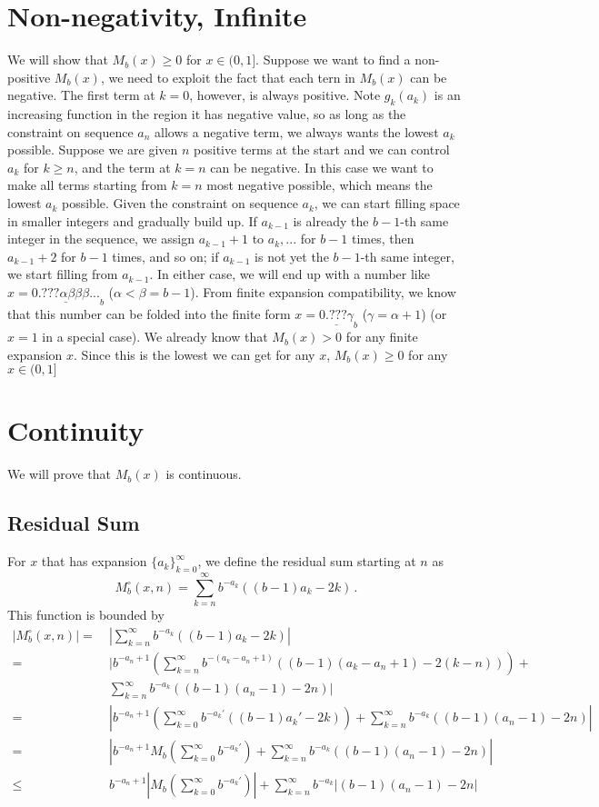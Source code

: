 \documentclass[]{article}
\begin{document}
\section{Non-negativity, Infinite}
We will show that $M_b(x) \ge 0$ for $x \in (0, 1]$. Suppose we want to find a non-positive $M_b(x)$, we need to exploit the fact that each tern in $M_b(x)$ can be negative. The first term at $k = 0$, however, is always positive. Note $g_k(a_k)$ is an increasing function in the region it has negative value, so as long as the constraint on sequence $a_n$ allows a negative term, we always wants the lowest $a_k$ possible. Suppose we are given $n$ positive terms at the start and we can control $a_k$ for $k \ge n$, and the term at $k=n$ can be negative. In this case we want to make all terms starting from $k=n$ most negative possible, which means the lowest $a_k$ possible. Given the constraint on sequence $a_k$, we can start filling space in smaller integers and gradually build up. If $a_{k-1}$ is already the $b-1$-th same integer in the sequence, we assign $a_{k-1}+1$ to $a_k,...$ for $b-1$ times, then $a_{k-1}+2$ for $b - 1$ times, and so on; if  $a_{k-1}$ is not yet the $b-1$-th same integer, we start filling from $a_{k-1}$. In either case, we will end up with a number like $x = \underline{0.???\alpha\beta\beta\beta...}_b$ ($\alpha < \beta = b - 1$). From finite expansion compatibility, we know that this number can be folded into the finite form $x = \underline{0.???\gamma}_b$ ($\gamma =\alpha + 1$) (or $x = 1$ in a special case). We already know that $M_b(x) > 0$ for any finite expansion $x$. Since this is the lowest we can get for any $x$, $M_b(x) \ge 0$ for any $x\in (0, 1]$ 

\section{Continuity}
We will prove that $M_b(x)$ is continuous.

\subsection{Residual Sum}
For $x$ that has expansion $\{a_k\}_{k=0}^{\infty}$, we define the residual sum starting at $n$ as
\[
M_b^{\circ}(x, n) = \sum_{k=n}^\infty b^{-a_k}((b-1)a_k-2k)\,.
\]
This function is bounded by
\begin{align*}
|M_b^{\circ}(x, n)|=&\ \left|\sum_{k=n}^\infty b^{-a_k}((b-1)a_k-2k)\right| \\
=&\  \Bigg|b^{-a_{n}+1}\left(\sum_{k=n}^\infty b^{-(a_k-a_{n}+1)}((b-1)(a_k-a_{n}+1)-2(k-n))\right) +\\&\ \sum_{k=n}^\infty b^{-a_k}((b-1)(a_{n}-1)-2n)\Bigg|\\
=&\ \left|b^{-a_{n}+1}\left(\sum_{k=0}^\infty b^{-a_k'}((b-1)a_k'-2k)\right) + \sum_{k=n}^\infty b^{-a_k}((b-1)(a_{n}-1)-2n)\right|\\
=&\ \left|b^{-a_{n}+1}M_b\left(\sum_{k=0}^\infty b^{-a_k'}\right) + \sum_{k=n}^\infty b^{-a_k}((b-1)(a_{n}-1)-2n)\right| \\
\le&\ b^{-a_{n}+1}\left|M_b\left(\sum_{k=0}^\infty b^{-a_k'}\right)\right| + \sum_{k=n}^\infty b^{-a_k}\Big|(b-1)(a_{n}-1)-2n\Big|\\
\end{align*}
\end{document}
